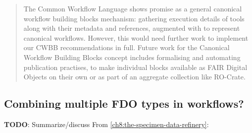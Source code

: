 \begin{quotation}
  The Common Workflow Language shows promise as a general canonical
  workflow building blocks mechanism: gathering execution details of tools
  along with their metadata and references, augmented with
   to represent canonical workflows.
  However, this would need
  further work to implement our CWBB recommendations in full.
  Future work
  for the Canonical Workflow Building Blocks concept includes formalising
  and automating publication practises, to make individual blocks
  available as FAIR Digital Objects on their own or as part of an
  aggregate collection like RO-Crate.
\end{quotation}


\subsection{Combining multiple FDO types in workflows?}

\textbf{TODO}: Summarize/discuss 
From \vref{ch8:the-specimen-data-refinery}:

